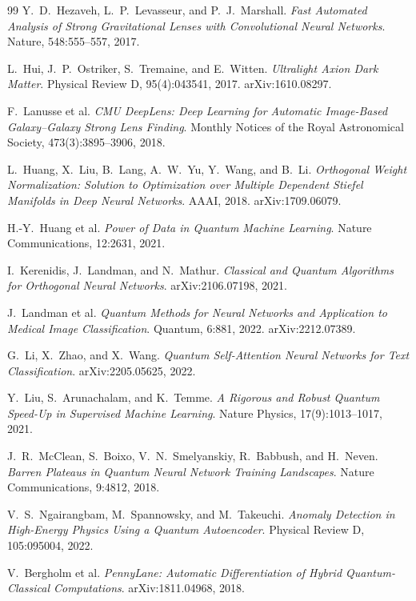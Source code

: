 \documentclass[10pt,letterpaper]{article}
\theoremstyle{plain}
\theoremstyle{definition}
\begin{document}
\begin{thebibliography}{99}
Y.~D.~Hezaveh, L.~P.~Levasseur, and P.~J.~Marshall.
\textit{Fast Automated Analysis of Strong Gravitational Lenses with
Convolutional Neural Networks}.
Nature, 548:555--557, 2017.

L.~Hui, J.~P.~Ostriker, S.~Tremaine, and E.~Witten.
\textit{Ultralight Axion Dark Matter}.
Physical Review D, 95(4):043541, 2017. arXiv:1610.08297.

F.~Lanusse et al.
\textit{CMU DeepLens: Deep Learning for Automatic Image-Based Galaxy--Galaxy
Strong Lens Finding}.
Monthly Notices of the Royal Astronomical Society, 473(3):3895--3906, 2018.

L.~Huang, X.~Liu, B.~Lang, A.~W.~Yu, Y.~Wang, and B.~Li.
\textit{Orthogonal Weight Normalization: Solution to Optimization over Multiple
Dependent Stiefel Manifolds in Deep Neural Networks}.
AAAI, 2018. arXiv:1709.06079.

H.-Y.~Huang et al.
\textit{Power of Data in Quantum Machine Learning}.
Nature Communications, 12:2631, 2021.

I.~Kerenidis, J.~Landman, and N.~Mathur.
\textit{Classical and Quantum Algorithms for Orthogonal Neural Networks}.
arXiv:2106.07198, 2021.

J.~Landman et al.
\textit{Quantum Methods for Neural Networks and Application to Medical Image
Classification}.
Quantum, 6:881, 2022. arXiv:2212.07389.

G.~Li, X.~Zhao, and X.~Wang.
\textit{Quantum Self-Attention Neural Networks for Text Classification}.
arXiv:2205.05625, 2022.

Y.~Liu, S.~Arunachalam, and K.~Temme.
\textit{A Rigorous and Robust Quantum Speed-Up in Supervised Machine Learning}.
Nature Physics, 17(9):1013--1017, 2021.

J.~R.~McClean, S.~Boixo, V.~N.~Smelyanskiy, R.~Babbush, and H.~Neven.
\textit{Barren Plateaus in Quantum Neural Network Training Landscapes}.
Nature Communications, 9:4812, 2018.

V.~S.~Ngairangbam, M.~Spannowsky, and M.~Takeuchi.
\textit{Anomaly Detection in High-Energy Physics Using a Quantum Autoencoder}.
Physical Review D, 105:095004, 2022.

V.~Bergholm et al.
\textit{PennyLane: Automatic Differentiation of Hybrid Quantum-Classical
Computations}.
arXiv:1811.04968, 2018.


\end{thebibliography}
\end{document}
